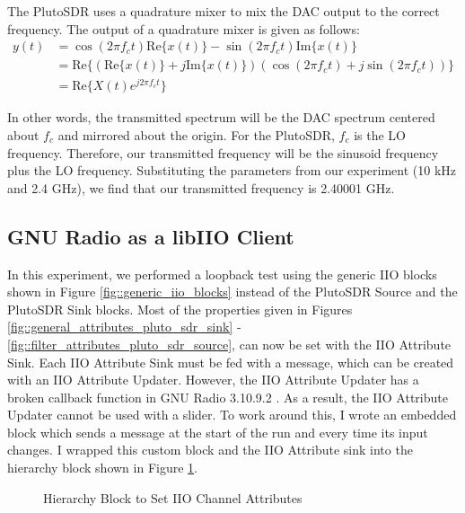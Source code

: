 \documentclass{article}
\begin{document}
The PlutoSDR uses a quadrature mixer to mix the DAC output to the correct frequency. The output of a quadrature mixer is given as follows:
\begin{align}
	y(t) &= \cos(2{\pi}f_ct)\text{Re}\{x(t)\} - \sin(2{\pi}f_ct)\text{Im}\{x(t)\} \\
	&= \text{Re}\{(\text{Re}\{x(t)\} + j\text{Im}\{x(t)\})(\cos(2{\pi}f_ct) + j\sin(2{\pi}f_ct))\} \\
	&= \text{Re}\{X(t)e^{j2{\pi}f_ct}\}
\end{align}

In other words, the transmitted spectrum will be the DAC spectrum centered about $f_c$ and mirrored about the origin. For the PlutoSDR, $f_c$ is the LO frequency. Therefore, our transmitted frequency will be the sinusoid frequency plus the LO frequency. Substituting the parameters from our experiment (10 kHz and 2.4 GHz), we find that our transmitted frequency is 2.40001 GHz. 

\subsection{GNU Radio as a libIIO Client}

In this experiment, we performed a loopback test using the generic IIO blocks shown in Figure \ref{fig::generic_iio_blocks} instead of the PlutoSDR Source and the PlutoSDR Sink blocks. Most of the properties given in Figures \ref{fig::general_attributes_pluto_sdr_sink} - \ref{fig::filter_attributes_pluto_sdr_source}, can now be set with the IIO Attribute Sink. Each IIO Attribute Sink must be fed with a message, which can be created with an IIO Attribute Updater. However, the IIO Attribute Updater has a broken callback function in GNU Radio 3.10.9.2 \cite{analog_devices_broken_iio_block}. As a result, the IIO Attribute Updater cannot be used with a slider. To work around this, I wrote an embedded block which sends a message at the start of the run and every time its input changes. I wrapped this custom block and the IIO Attribute sink into the hierarchy block shown in Figure \ref{fig::iio_input_channel_attribute}.

\begin{figure}[H]
	\centerline{}
	\caption{Hierarchy Block to Set IIO Channel Attributes}
	\label{fig::iio_input_channel_attribute}
\end{figure}
\end{document}

